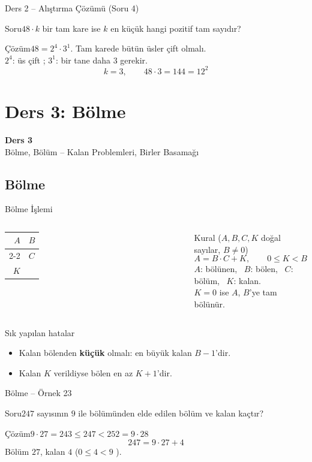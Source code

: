 \documentclass[aspectratio=169,11pt]{beamer}
\newcommand{\soru}[3]{%
\begin{frame}{#1}
  \begin{block}{Soru}\large #2\end{block}
  \pause
  \begin{exampleblock}{Çözüm}\large #3\end{exampleblock}
\end{frame}}
\begin{document}
\soru{Ders 2 -- Alıştırma Çözümü (Soru 4)}
{\(48\cdot k\) bir tam kare ise \(k\) en küçük hangi pozitif tam sayıdır?}
{\(48=2^4\cdot 3^1\). Tam karede bütün üsler çift olmalı.\\[3pt]
\(2^4\): üs çift \checkmark; \quad \(3^1\): bir tane daha \(3\) gerekir.
\[k=3,\qquad 48\cdot 3=144=12^2\]}


\section{Ders 3: Bölme}
\begin{frame}
\centering\Large\color{anamavi}\textbf{Ders 3}\\[6pt]\normalsize Bölme, Bölüm -- Kalan Problemleri, Birler Basamağı
\end{frame}

\subsection{Bölme}
\begin{frame}{Bölme İşlemi}
\begin{columns}[c]
\centering\Large
\begin{tabular}{r|l}
\(A\) & \(B\)\\\cline{2-2}
 & \(C\)\\
\(K\) &
\end{tabular}
\begin{block}{Kural (\(A,B,C,K\) doğal sayılar, \(B\neq 0\))}
\[A=B\cdot C+K,\qquad 0\le K<B\]
\(A\): bölünen, \ \(B\): bölen, \ \(C\): bölüm, \ \(K\): kalan.\\
\(K=0\) ise \(A\), \(B\)'ye tam bölünür.
\end{block}
\end{columns}
\begin{alertblock}{Sık yapılan hatalar}
\begin{itemize}
\item Kalan bölenden \textbf{küçük} olmalı: en büyük kalan \(B-1\)'dir.
\item Kalan \(K\) verildiyse bölen en az \(K+1\)'dir.
\end{itemize}
\end{alertblock}
\end{frame}

\soru{Bölme -- Örnek 23}
{\(247\) sayısının \(9\) ile bölümünden elde edilen bölüm ve kalan kaçtır?}
{\(9\cdot 27=243\le 247<252=9\cdot 28\)
\[247=9\cdot 27+4\]
Bölüm \(27\), kalan \(4\) \quad (\(0\le 4<9\) \checkmark).}
\end{document}

